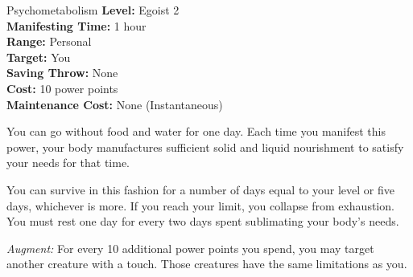 {Psychometabolism}
{
	\textbf{Level:}
	Egoist 2\\
	\textbf{Manifesting Time:}
	1 hour\\
	\textbf{Range:}
	Personal\\
	\textbf{Target:}
	You\\
	\textbf{Saving Throw:}
	None\\
	\textbf{Cost:}
	10 power points\\
	\textbf{Maintenance Cost:}
	None (Instantaneous)\\
}
{
	You can go without food and water for one day. Each time you manifest this power, your body manufactures sufficient solid and liquid nourishment to satisfy your needs for that time.

	You can survive in this fashion for a number of days equal to your level or five days, whichever is more. If you reach your limit, you collapse from exhaustion. You must rest one day for every two days spent sublimating your body's needs.

	\textit{Augment:} For every 10 additional power points you spend, you may target another creature with a touch. Those creatures have the same limitations as you.
}
